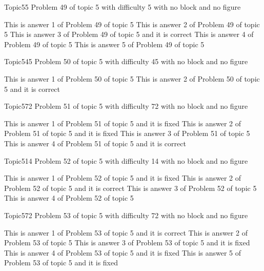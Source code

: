 \documentclass[master]{exam}
\begin{document}
\begin{problem}{Topic5}{5}
	Problem 49 of topic 5 with difficulty 5 with no block and no figure
	\begin{answers}
		\answer This is answer 1 of Problem 49 of topic 5 
		\answer This is answer 2 of Problem 49 of topic 5 
		\answer[correct] This is answer 3 of Problem 49 of topic 5 and it is correct
		\answer This is answer 4 of Problem 49 of topic 5 
		\answer This is answer 5 of Problem 49 of topic 5 
	\end{answers}
\end{problem}

\begin{problem}{Topic5}{45}
	Problem 50 of topic 5 with difficulty 45 with no block and no figure
	\begin{answers}
		\answer This is answer 1 of Problem 50 of topic 5 
		\answer[correct] This is answer 2 of Problem 50 of topic 5 and it is correct
	\end{answers}
\end{problem}

\begin{problem}{Topic5}{72}
	Problem 51 of topic 5 with difficulty 72 with no block and no figure
	\begin{answers}
		\answer[fixed] This is answer 1 of Problem 51 of topic 5 and it is fixed
		\answer[fixed] This is answer 2 of Problem 51 of topic 5 and it is fixed
		\answer This is answer 3 of Problem 51 of topic 5 
		\answer[correct] This is answer 4 of Problem 51 of topic 5 and it is correct
	\end{answers}
\end{problem}

\begin{problem}{Topic5}{14}
	Problem 52 of topic 5 with difficulty 14 with no block and no figure
	\begin{answers}
		\answer[fixed] This is answer 1 of Problem 52 of topic 5 and it is fixed
		\answer[correct] This is answer 2 of Problem 52 of topic 5 and it is correct
		\answer This is answer 3 of Problem 52 of topic 5 
		\answer This is answer 4 of Problem 52 of topic 5 
	\end{answers}
\end{problem}

\begin{problem}{Topic5}{72}
	Problem 53 of topic 5 with difficulty 72 with no block and no figure
	\begin{answers}
		\answer[correct] This is answer 1 of Problem 53 of topic 5 and it is correct
		\answer This is answer 2 of Problem 53 of topic 5 
		\answer[fixed] This is answer 3 of Problem 53 of topic 5 and it is fixed
		\answer[fixed] This is answer 4 of Problem 53 of topic 5 and it is fixed
		\answer[fixed] This is answer 5 of Problem 53 of topic 5 and it is fixed
	\end{answers}
\end{problem}
\end{document}
